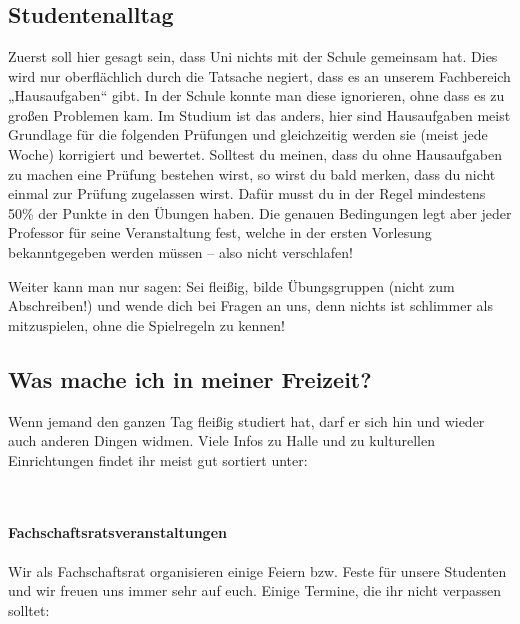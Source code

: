 \\
\\
\\

\subsection{Studentenalltag}

Zuerst soll hier gesagt sein, dass Uni nichts mit der Schule gemeinsam hat.
Dies wird nur oberflächlich durch die Tatsache negiert, dass es an unserem Fachbereich „Hausaufgaben“ gibt.
In der Schule konnte man diese ignorieren, ohne dass es zu großen Problemen kam.
Im Studium ist das anders, hier sind Hausaufgaben meist Grundlage für die folgenden Prüfungen und gleichzeitig werden sie (meist jede Woche) korrigiert und bewertet.
Solltest du meinen, dass du ohne Hausaufgaben zu machen eine Prüfung bestehen wirst, so wirst du bald merken, dass du nicht einmal zur Prüfung zugelassen wirst.
Dafür musst du in der Regel mindestens 50\% der Punkte in den Übungen haben.
Die genauen Bedingungen legt aber jeder Professor für seine Veranstaltung fest, welche in der ersten Vorlesung bekanntgegeben werden müssen -- also nicht verschlafen!

Weiter kann man nur sagen: Sei fleißig, bilde Übungsgruppen (nicht zum Abschreiben!) und wende dich bei Fragen an uns, denn nichts ist schlimmer als mitzuspielen, ohne die Spielregeln zu kennen!

\subsection{Was mache ich in meiner Freizeit?}

Wenn jemand den ganzen Tag fleißig studiert hat, darf er sich hin und wieder auch anderen Dingen widmen.
Viele Infos zu Halle und zu kulturellen Einrichtungen findet ihr meist gut sortiert unter:

\\

\paragraph{Fachschaftsratsveranstaltungen}
Wir als Fachschaftsrat organisieren einige Feiern bzw. Feste für unsere Studenten und wir freuen uns immer sehr auf euch.
Einige Termine, die ihr nicht verpassen solltet:

